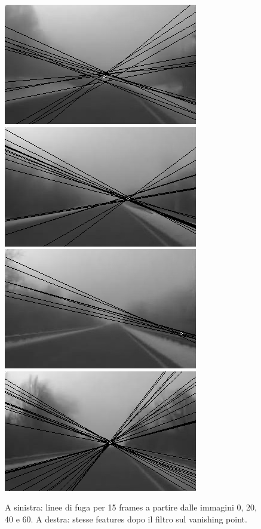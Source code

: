 \documentclass[12pt]{report}
\begin{document}
\begin{figure}
\begin{minipage}[c]{0.5\linewidth}
	\includegraphics[scale=\imTrackScale]{images/aF_0000_15.png}
	\includegraphics[scale=\imTrackScale]{images/aF_0020_15.png}
	\includegraphics[scale=\imTrackScale]{images/aF_0040_15.png}
	\includegraphics[scale=\imTrackScale]{images/aF_0060_15.png}
\end{minipage}
\caption[short]{A sinistra: linee di fuga per 15 frames a partire dalle immagini 0, 20, 40 e 60. A destra: stesse features dopo il filtro sul vanishing point.}
\label{fig:vp15}
\end{figure}
\end{document}
